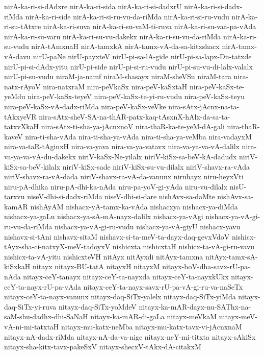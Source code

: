{nirA-ka-ri-si-dAdxre
nirA-ka-ri-sida
nirA-ka-ri-si-dadxrU
nirA-ka-ri-si-dadx-riMda
nirA-ka-ri-side
nirA-ka-ri-si-ru-vu-da-riMda
nirA-ka-ri-si-ru-vudu
nirA-ka-ri-su-tAtxre
nirA-ka-ri-suva
nirA-ka-ri-su-vaM-ti-ruva
nirA-ka-ri-su-vaa-pa-vAda
nirA-ka-ri-su-varu
nirA-ka-ri-su-vu-dakekx
nirA-ka-ri-su-vu-da-riMda
nirA-ka-ri-su-vudu
nirA-tAmxnaH
nirA-tamxkA
nirA-tamx-vA-da-sa-kitxshacx
nirA-tamx-vA-davu
nirU-paNe
nirU-payxteV
nirU-pi-sa-lA-gide
nirU-pi-sa-lapx-Du-tatxde
nirU-pi-si-dAdx-yitu
nirU-pi-side
nirU-pi-si-ru-vudu
nirU-pi-su-vu-di-lalx-valalx
nirU-pi-su-vudu
niraM-ja-namf
niraM-shasayx
niraM-sheVSu
niraM-tara
nira-natx-rAyoV
nira-natxraM
nira-peVkaSx
nira-peV-kaSxtaH
nira-peV-kaSx-te-yeMdu
nira-peV-kaSx-teyeV
nira-peV-kaSx-te-yi-ru-vudu
nira-peV-kaSx-teyu
nira-peV-kaSx-vA-dadx-riMda
nira-peV-kaSx-veVke
nira-sAtx-jAcnx-na-ta-tAkxyeVR
nira-sAtx-sheV-SA-na-thAR-patx-kaq-tAsxnX-hAlx-da-sa-ta-tatxvXkaH
nira-sAtx-ti-sha-ya-jAcnxnoV
nira-thaR-ka-te-yeM-dA-gali
nira-thaR-kaveV
nira-ti-sha-vAda
nira-ti-sha-ya-vAda
nira-ti-sha-ya-veMba
nira-vadayxM
nira-va-taR-tAginxH
nira-va-yava
nira-va-ya-vatavx
nira-va-ya-va-vA-dalilx
nira-va-ya-va-vA-du-dakekx
niriV-kaSx-Ne-yilalx
niriV-kiSx-sa-beV-kA-dadudx
niriV-kiSx-sa-beV-kilalx
niriV-kiSx-sade
niriV-kiSx-su-vu-dilalx
niriV-shavx-ra-vAda
niriV-shavx-ra-vA-dada
niriV-shavx-ra-vA-da-vanunx
niruhayx
niru-heyxVti
niru-pA-dhika
niru-pA-dhi-ka-nAda
niru-pa-yoV-gi-yAda
niru-vu-dilalx
nisU-tarxvu
niseV-dhi-si-dadx-riMda
niseV-dhi-si-dare
nishAvx-sa-daMte
nishAvx-sa-kamAR
nishAyAM
nishacx-yA-tamx-ka-vAda
nishacxya
nishacx-ya-diMda
nishacx-ya-gaLu
nishacx-ya-sA-mA-nayx-dalilx
nishacx-ya-vAgi
nishacx-ya-vA-gi-ru-vu-da-riMda
nishacx-ya-vA-gi-ru-vudu
nishacx-ya-vA-giyU
nishacx-yavu
nishavx-si-tAni
nishavx-sitaM
nishavx-si-ta-meV-ta-dayx-daq-gevxVdoV
nishicx-tAyx-sha-ci-natxyX-meV-tadoyxV
nishicxta
nishicxtaH
nishicx-ta-vA-gi-ru-vavu
nishicx-ta-vA-yitu
nishicxteVH
nitAyx
nitAyxdi
nitAyx-tamxna
nitAyx-tamx-sA-kiSxkaH
nitayx
nitayx-BU-tatA
nitayxH
nitayxM
nitayx-boV-dha-savx-rU-pa-nAda
nitayx-ceY-tanayx
nitayx-ceY-ta-nayxda
nitayx-ceY-ta-nayxkUkx
nitayx-ceY-ta-nayx-rU-pa-vAda
nitayx-ceY-ta-nayx-savx-rU-pa-vA-gi-ru-va-naSeTx
nitayx-ceY-ta-nayx-vanunx
nitayx-daq-SiTx-yalelx
nitayx-daq-SiTx-yiMda
nitayx-daq-SiTx-yi-ruva
nitayx-daq-SiTx-yoMdeV
nitayx-ka-mAR-dayx-nu-SAThx-na-saM-shu-dadhx-dhi-SaNaH
nitayx-ka-mAR-di-gaLa
nitayx-meVkaM
nitayx-meV-vA-ni-mi-tatxtaH
nitayx-mu-katx-neMba
nitayx-mu-katx-tavx-vi-jAcnxnaM
nitayx-nA-dadx-riMda
nitayx-nA-da-va-nige
nitayx-neY-mi-titxta
nitayx-sAkiSx
nitayx-sha-kitx-tavx-pakeSxV
nitayx-shecxV-tAkx-dA-citakxM
}
